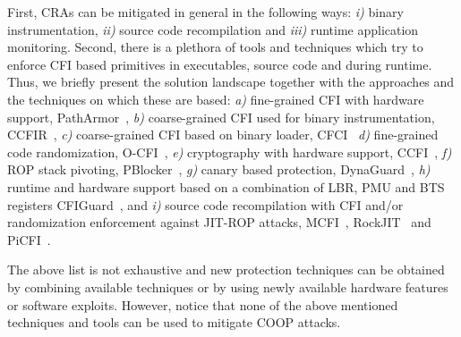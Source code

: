 First, CRAs can be mitigated in general in the following ways: 
\textit{i)} binary instrumentation,
\textit{ii)} source code recompilation and 
\textit{iii)} runtime application monitoring.
Second, there is a plethora of tools and techniques which try to enforce CFI based
primitives in executables, source code and during runtime. Thus, we briefly
present the solution landscape together with the approaches and the techniques on which these are based:
\textit{a)} fine-grained CFI with hardware support, PathArmor~\cite{veen:cfi},
\textit{b)} coarse-grained CFI used for binary instrumentation, CCFIR~\cite{ccfir:zhang},
\textit{c)} coarse-grained CFI based on binary loader, CFCI~\cite{cfci:zhang}
\textit{d)} fine-grained code randomization, O-CFI~\cite{mohan:opaque},
\textit{e)} cryptography with hardware support, CCFI~\cite{ccfi:jose},
\textit{f)} ROP stack pivoting, PBlocker~\cite{pblocker:prakash},
\textit{g)} canary based protection, DynaGuard~\cite{dynaguard:petsios},
\textit{h)} runtime and hardware support based on a combination of LBR, PMU and BTS registers CFIGuard~\cite{cfiguard:yuan}, and
\textit{i)} source code recompilation with CFI and/or randomization enforcement against JIT-ROP attacks, MCFI~\cite{mcfi:niu}, 
RockJIT~\cite{rockjit:niu} and PiCFI~\cite{perinput:niu}.

The above list is not exhaustive and new protection techniques can be obtained by combining available techniques
or by using newly available hardware features or software exploits. However, notice that none of the above mentioned 
techniques and tools can be used to mitigate COOP attacks.


